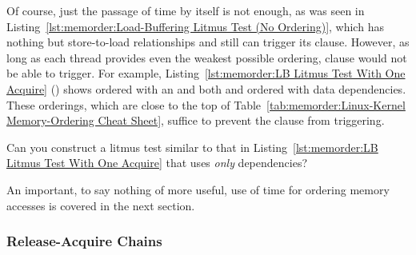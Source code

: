 Of course, just the passage of time by itself is not enough, as
was seen in
Listing~\ref{lst:memorder:Load-Buffering Litmus Test (No Ordering)},
which has nothing but store-to-load relationships and still can
trigger its  clause.
However, as long as each thread provides even the weakest possible
ordering,  clause would not be able to trigger.
For example,
Listing~\ref{lst:memorder:LB Litmus Test With One Acquire}
()
shows  ordered with an  and
both  and  ordered with data dependencies.
These orderings, which are close to the top of
Table~\ref{tab:memorder:Linux-Kernel Memory-Ordering Cheat Sheet},
suffice to prevent the  clause from triggering.

\QuickQuiz{}
	Can you construct a litmus test similar to that in
	Listing~\ref{lst:memorder:LB Litmus Test With One Acquire}
	that uses \emph{only} dependencies?
 \QuickQuizEnd

An important, to say nothing of more useful, use of time for ordering
memory accesses is covered in the next section.

\subsubsection{Release-Acquire Chains}
\label{sec:memorder:Release-Acquire Chains}

